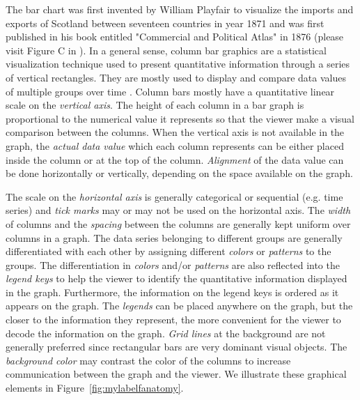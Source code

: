 The bar chart was first invented by William Playfair to visualize the imports and exports of Scotland between seventeen countries in year 1871 and was first published in his book entitled "Commercial and Political Atlas" in 1876 (please visit Figure C  in \cite{beniger1978quantitative}).
In a general sense, column bar graphics are a statistical visualization technique used to present quantitative information through a series of vertical rectangles. They are mostly used to display and compare data values of multiple groups over time \citep{harris2000information}. Column bars mostly have a quantitative linear scale on the \textit{vertical axis}.  The height of each column in a bar graph is  proportional to the numerical value it represents so that the viewer make a visual comparison between the columns. 
When the vertical axis is not available in the graph, the \textit{actual data value} which each column represents can be either placed inside the column or at the top of the column. \textit{Alignment} of the data value can be done horizontally or vertically, depending on the space available on the graph. 

The scale on the \textit{horizontal axis} is generally categorical or sequential (e.g. time series) and \textit{tick marks} may or may not be used on the horizontal axis. The \textit{width} of columns and the \textit{spacing} between the columns are generally kept uniform over columns in a graph. The data series belonging to different groups are generally differentiated with each other by assigning different \textit{colors} or \textit{patterns} to the groups. The differentiation in \textit{colors} and/or \textit{patterns} are also reflected into the \textit{legend keys} to help the viewer to identify the quantitative information displayed in the graph. Furthermore, the information on the legend keys is ordered as it appears on the graph. The \textit{legends} can be placed anywhere on the graph, but the closer to the information they represent, the more convenient for the viewer to decode the information on the graph. \textit{Grid lines} at the background are not generally preferred since rectangular bars are very dominant visual objects. The \textit{background color} may contrast the color of the columns to increase communication between the graph and the viewer. We illustrate these graphical elements in Figure~\ref{fig:mylabelfanatomy}.


